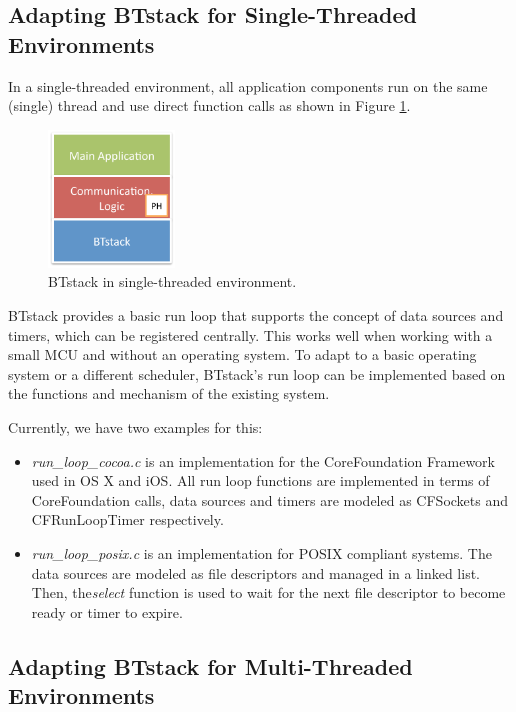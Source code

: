 \documentclass[a4paper,titlepage,oneside,12pt]{amsart} %
\begin{document}
\subsection{Adapting BTstack for Single-Threaded Environments}
\label{section:singlethreading}

In a single-threaded environment, all application components run on the same (single) thread and use direct function calls as shown in Figure \ref{fig:BTstackSingle}.

\begin{figure}[htbp] %
   \centering
   \includegraphics[width=0.3\textwidth]{picts/singlethreading-btstack.pdf} 
   \caption{BTstack in single-threaded environment. }
   \label{fig:BTstackSingle}
\end{figure}

BTstack provides a basic run loop that supports the concept of data sources and timers, which can be registered centrally. This works well when working with a small MCU and without an operating system.
To adapt to a basic operating system or a different scheduler, BTstack's run loop can be implemented based on the functions and mechanism of the existing system. 

Currently, we have two examples for this:
\begin{itemize}
\item \emph{run\_loop\_cocoa.c} is an implementation for the CoreFoundation Framework used in OS X and iOS. All run loop functions are implemented in terms of CoreFoundation calls, data sources and timers are modeled as CFSockets and CFRunLoopTimer respectively. 
\item \emph{run\_loop\_posix.c} is an implementation for POSIX compliant systems. The data sources are modeled as file descriptors and managed in a linked list. Then, the\emph{select} function is used to wait for the next file descriptor to become ready or timer to expire. 
\end{itemize}

\subsection{Adapting BTstack for Multi-Threaded Environments}
\label{section:multithreading}
\end{document}
